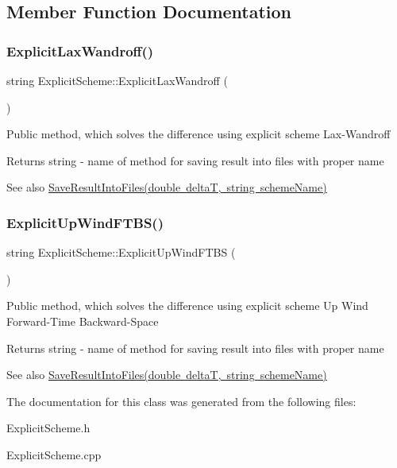 \subsection{Member Function Documentation}
\mbox{\label{class_explicit_scheme_a2698e08e62763c56b972b478d665c34c}} 
\subsubsection{\texorpdfstring{Explicit\+Lax\+Wandroff()}{ExplicitLaxWandroff()}}
{\footnotesize\ttfamily string Explicit\+Scheme\+::\+Explicit\+Lax\+Wandroff (\begin{DoxyParamCaption}{ }\end{DoxyParamCaption})}

Public method, which solves the difference using explicit scheme Lax-\/\+Wandroff \begin{DoxyReturn}{Returns}
string -\/ name of method for saving result into files with proper name 
\end{DoxyReturn}
\begin{DoxySeeAlso}{See also}
\mbox{\hyperlink{class_scheme_ae4512b4c8ead4d8ced95174f0b241f8a}{Save\+Result\+Into\+Files(double delta\+T, string scheme\+Name)}} 
\end{DoxySeeAlso}
\mbox{\label{class_explicit_scheme_a52c0d19315a6014f43a9d007c70582d6}} 
\subsubsection{\texorpdfstring{Explicit\+Up\+Wind\+F\+T\+B\+S()}{ExplicitUpWindFTBS()}}
{\footnotesize\ttfamily string Explicit\+Scheme\+::\+Explicit\+Up\+Wind\+F\+T\+BS (\begin{DoxyParamCaption}{ }\end{DoxyParamCaption})}

Public method, which solves the difference using explicit scheme Up Wind Forward-\/\+Time Backward-\/\+Space \begin{DoxyReturn}{Returns}
string -\/ name of method for saving result into files with proper name 
\end{DoxyReturn}
\begin{DoxySeeAlso}{See also}
\mbox{\hyperlink{class_scheme_ae4512b4c8ead4d8ced95174f0b241f8a}{Save\+Result\+Into\+Files(double delta\+T, string scheme\+Name)}} 
\end{DoxySeeAlso}


The documentation for this class was generated from the following files\+:\begin{DoxyCompactItemize}
\item 
Explicit\+Scheme.\+h\item 
Explicit\+Scheme.\+cpp\end{DoxyCompactItemize}
